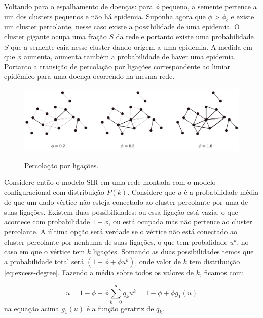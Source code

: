 \documentclass[a4paper,11pt]{report}
\begin{document}
Voltando para o espalhamento de doen\c{c}as: para $\phi$ pequeno, a semente pertence a um dos clusters pequenos e n\~ao h\'a epidemia. Suponha agora que $\phi>\phi_c$ e existe um cluster percolante, nesse caso existe a possibilidade de uma epidemia. O cluster gigante ocupa uma fra\c{c}\~ao $S$ da rede e portanto existe uma probabilidade $S$ que a semente caia nesse cluster dando origem a uma epidemia. A medida em que $\phi$ aumenta, aumenta tamb\'em a probabilidade de haver uma epidemia. Portanto a transi\c{c}\~ao de percola\c{c}\~ao por liga\c{c}\~oes correspondente ao limiar epid\^emico para uma doen\c{c}a ocorrendo na mesma rede.

\begin{figure}[ht!]
\begin{center}
\includegraphics[scale=0.1]{./images/perc.pdf}
\label{fig:perc}
\caption{Percola\c{c}\~ao por liga\c{c}\~oes.}
\end{center}
\end{figure}

Considere ent\~ao o modelo SIR em uma rede montada com o modelo configuracional com distribui\c{c}\~ao $P(k)$. Considere que $u$ \'e a probabilidade m\'edia de que um dado v\'ertice n\~ao esteja conectado ao cluster percolante por uma de suas liga\c{c}\~oes. Existem duas possibilidades: ou essa liga\c{c}\~ao est\'a vazia, o que acontece com probabilidade $1-\phi$, ou est\'a ocupada mas n\~ao pertence ao cluster percolante. A \'ultima op\c{c}\~ao ser\'a verdade se o v\'ertice n\~ao est\'a conectado ao cluster percolante por nenhuma de suas liga\c{c}\~oes, o que tem probalidade $u^k$, no caso em que o v\'ertice tem $k$ liga\c{c}\~oes. Somando as duas possibilidades temos que a probabilidade total ser\'a $(1-\phi+\phi u^{k})$, onde valor de $k$ tem distribui\c{c}\~ao \ref{eq:excess-degree}. Fazendo a m\'edia sobre todos os valores de $k$, ficamos com:

\begin{equation}
u=1-\phi+\phi\sum_{k=0}^{\infty}q_ku^{k}=1-\phi+\phi g_1(u)
\label{eq:not-connect}
\end{equation}
na equa\c{c}\~ao acima $g_1(u)$ \'e a fun\c{c}\~ao geratriz de $q_k$.
\end{document}
